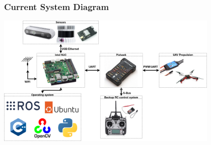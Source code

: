 \documentclass[aspectratio=169]{beamer}
\begin{document}
\begin{frame}


\end{frame}



\begin{frame}
\frametitle{Current System Diagram}

\begin{center}
  \includegraphics[width=0.8\textwidth]{./fig/new_diagram.png}
\end{center}

\end{frame}
\end{document}
